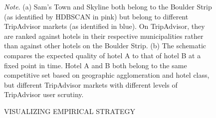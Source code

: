 \documentclass[mksc,blindrev]{informs3} %
\begin{document}
\begin{figure}[htp]
\centering
{}


\begin{flushleft}
\small
\textit{Note}. (a) Sam's Town and Skyline both belong to the Boulder Strip (as identified by HDBSCAN in pink) but belong to different TripAdvisor markets (as identified in blue). On TripAdvisor, they are ranked against hotels in their respective municipalities rather than against other hotels on the Boulder Strip. (b) The schematic compares the expected quality of hotel A to that of hotel B at a fixed point in time. Hotel A and B both belong to the same competitive set based on geographic agglomeration and hotel class, but different TripAdvisor markets with different levels of TripAdvisor user scrutiny.
\end{flushleft}

\caption{VISUALIZING EMPIRICAL STRATEGY}
\end{figure}
\clearpage
\end{document}
